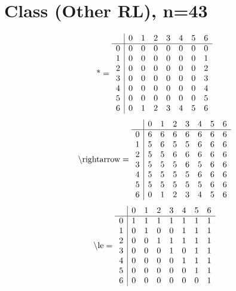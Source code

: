 \documentclass[11pt]{article}
\begin{document}
\section{Class (Other RL), n=43}
\[\text{*} = 
\begin{array}{r | r r r r r r r}
 & 0 & 1 & 2 & 3 & 4 & 5 & 6 \\ \hline
0 & 0 & 0 & 0 & 0 & 0 & 0 & 0 \\
1 & 0 & 0 & 0 & 0 & 0 & 0 & 1 \\
2 & 0 & 0 & 0 & 0 & 0 & 0 & 2 \\
3 & 0 & 0 & 0 & 0 & 0 & 0 & 3 \\
4 & 0 & 0 & 0 & 0 & 0 & 0 & 4 \\
5 & 0 & 0 & 0 & 0 & 0 & 0 & 5 \\
6 & 0 & 1 & 2 & 3 & 4 & 5 & 6 \\
\end{array}
\]
\[\text{\textbackslash rightarrow} = 
\begin{array}{r | r r r r r r r}
 & 0 & 1 & 2 & 3 & 4 & 5 & 6 \\ \hline
0 & 6 & 6 & 6 & 6 & 6 & 6 & 6 \\
1 & 5 & 6 & 5 & 5 & 6 & 6 & 6 \\
2 & 5 & 5 & 6 & 6 & 6 & 6 & 6 \\
3 & 5 & 5 & 5 & 6 & 5 & 6 & 6 \\
4 & 5 & 5 & 5 & 5 & 6 & 6 & 6 \\
5 & 5 & 5 & 5 & 5 & 5 & 6 & 6 \\
6 & 0 & 1 & 2 & 3 & 4 & 5 & 6 \\
\end{array}
\]
\[\text{\textbackslash le} = 
\begin{array}{r | r r r r r r r}
 & 0 & 1 & 2 & 3 & 4 & 5 & 6 \\ \hline
0 & 1 & 1 & 1 & 1 & 1 & 1 & 1 \\
1 & 0 & 1 & 0 & 0 & 1 & 1 & 1 \\
2 & 0 & 0 & 1 & 1 & 1 & 1 & 1 \\
3 & 0 & 0 & 0 & 1 & 0 & 1 & 1 \\
4 & 0 & 0 & 0 & 0 & 1 & 1 & 1 \\
5 & 0 & 0 & 0 & 0 & 0 & 1 & 1 \\
6 & 0 & 0 & 0 & 0 & 0 & 0 & 1 \\
\end{array}
\]
\end{document}
